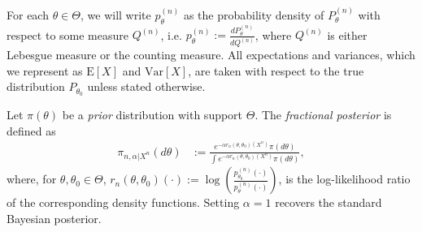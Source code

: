 \documentclass[11pt]{amsart}
\newcommand{\E}{\mathrm{E}}
\newcommand{\Var}{\mathrm{Var}}
\newcommand{\loglik}{r_n(\theta,\theta_0)}
\begin{document}
For each $\theta \in \Theta$, we will write $p_{\theta}^{(n)}$ as the probability density of $P_{\theta}^{(n)}$ with respect to some measure $Q^{(n)}$, i.e. $p_{\theta}^{(n)}:=\frac{dP_{\theta}^{(n)}}{dQ^{(n)}}$, where $Q^{(n)}$ is either Lebesgue measure or the counting measure.
All expectations and variances, which we represent as $\E[X]$ and $\Var[X]$, are taken with respect to the true distribution $P_{\theta_0}$ unless stated otherwise.

Let $\pi(\theta)$ be a {\it prior} distribution with support $\Theta$. The {\it fractional posterior} is defined as 
\begin{align}
    \pi_{n,\alpha|X^n} (d\theta)& := \frac{ e^{-\alpha\loglik(X^n)} \pi(d\theta)}{ \int e^{-\alpha\loglik(X^n)} \pi(d\theta) },
  \end{align}
where, for $\theta, \theta_0 \in \Theta$, $r_n(\theta,\theta_0)(\cdot) := \log\left(\frac{p^{(n)}_{\theta_0}(\cdot)}{p^{(n)}_{\theta}(\cdot)}\right)$, is the log-likelihood ratio of the corresponding density functions. Setting $\alpha=1$ recovers the standard Bayesian posterior. 
\end{document}
